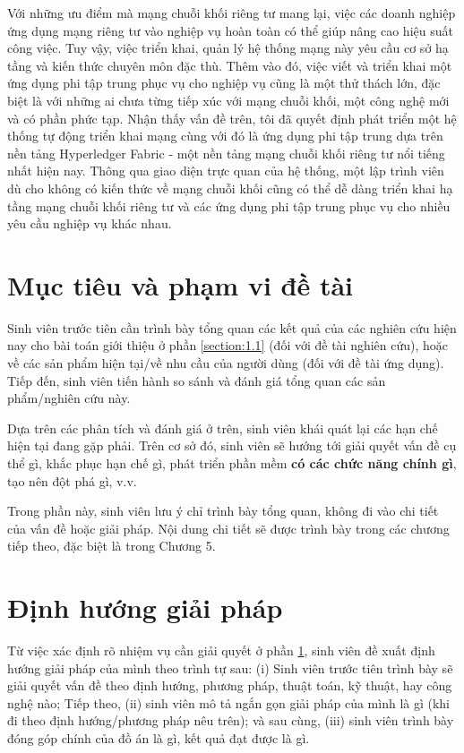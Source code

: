 \documentclass[../DoAn.tex]{subfiles}
\begin{document}
Với những ưu điểm mà mạng chuỗi khối riêng tư mang lại, việc các doanh nghiệp ứng dụng mạng riêng tư vào nghiệp vụ hoàn toàn có thể giúp nâng cao hiệu suất công việc. Tuy vậy, việc triển khai, quản lý hệ thống mạng này yêu cầu cơ sở hạ tầng và kiến thức chuyên môn đặc thù. Thêm vào đó, việc viết và triển khai một ứng dụng phi tập trung phục vụ cho nghiệp vụ cũng là một thử thách lớn, đặc biệt là với những ai chưa từng tiếp xúc với mạng chuỗi khối, một công nghệ mới và có phần phức tạp. Nhận thấy vấn đề trên, tôi đã quyết định phát triển một hệ thống tự động triển khai mạng cùng với đó là ứng dụng phi tập trung dựa trên nền tảng Hyperledger Fabric - một nền tảng mạng chuỗi khối riêng tư nổi tiếng nhất hiện nay. Thông qua giao diện trực quan của hệ thống, một lập trình viên dù cho không có kiến thức về mạng chuỗi khối cũng có thể dễ dàng triển khai hạ tầng mạng chuỗi khối riêng tư và các ứng dụng phi tập trung phục vụ cho nhiều yêu cầu nghiệp vụ khác nhau.

\section{Mục tiêu và phạm vi đề tài}
\label{section:1.2}
Sinh viên trước tiên cần trình bày tổng quan các kết quả của các nghiên cứu hiện nay cho bài toán giới thiệu ở phần \ref{section:1.1} (đối với đề tài nghiên cứu), hoặc về các sản phẩm hiện tại/về nhu cầu của người dùng (đối với đề tài ứng dụng). Tiếp đến, sinh viên tiến hành so sánh và đánh giá tổng quan các sản phẩm/nghiên cứu này.

Dựa trên các phân tích và đánh giá ở trên, sinh viên khái quát lại các hạn chế hiện tại đang gặp phải. Trên cơ sở đó, sinh viên sẽ hướng tới giải quyết vấn đề cụ thể gì, khắc phục hạn chế gì, phát triển phần mềm \textbf{có các chức năng chính gì}, tạo nên đột phá gì, v.v.

Trong phần này, sinh viên lưu ý chỉ trình bày tổng quan, không đi vào chi tiết của vấn đề hoặc giải pháp. Nội dung chi tiết sẽ được trình bày trong các chương tiếp theo, đặc biệt là trong Chương 5.

\section{Định hướng giải pháp}
\label{section:1.3}

Từ việc xác định rõ nhiệm vụ cần giải quyết ở phần \ref{section:1.2}, sinh viên đề xuất định hướng giải pháp của mình theo trình tự sau: (i) Sinh viên trước tiên trình bày sẽ giải quyết vấn đề theo định hướng, phương pháp, thuật toán, kỹ thuật, hay công nghệ nào; Tiếp theo, (ii) sinh viên mô tả ngắn gọn giải pháp của mình là gì (khi đi theo định hướng/phương pháp nêu trên); và sau cùng, (iii) sinh viên trình bày đóng góp chính của đồ án là gì, kết quả đạt được là gì.
\end{document}
